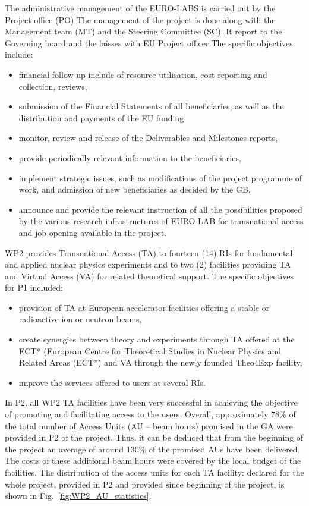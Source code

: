 The administrative management of the EURO-LABS is carried out by the Project office (PO) The management of the project is done along with the Management team (MT) and the Steering Committee (SC). It report to the Governing board and the laisses with EU Project officer.The specific objectives include:
\begin{itemize}
    \item financial follow-up include of resource utilisation, cost reporting and collection, reviews,
    \item submission of the Financial Statements of all beneficiaries, as well as the distribution and payments of the EU funding,
    \item monitor, review and release of the Deliverables and Milestones reports,
    \item provide periodically relevant information to the beneficiaries,
    \item implement strategic issues, such as modifications of the project programme of work, and admission of new beneficiaries as decided by the GB,
    \item announce and provide the relevant instruction of all the possibilities   proposed by the various research infrastructures of EURO-LAB for transnational access and job opening available in the project.
\end{itemize}


WP2 provides Transnational Access (TA) to fourteen (14) RIs for fundamental and applied nuclear physics experiments and to two (2) facilities providing TA and Virtual Access (VA) for related theoretical support. 
The specific objectives for P1 included: 
\begin{itemize}
    \item provision of TA at European accelerator facilities offering a stable or radioactive ion or neutron beams,
    \item create synergies between theory and experiments through TA offered at the ECT* (European Centre for Theoretical Studies in Nuclear Physics and Related Areas (ECT*) and VA through the newly founded Theo4Exp facility,
    \item improve the services offered to users at several RIs.
\end{itemize}

In P2, all WP2 TA facilities have been very successful in achieving the objective of promoting and facilitating access to the users. Overall, approximately 78\% of the total number of Access Units (AU – beam hours) promised in the GA were provided in P2 of the project. Thus, it can be deduced that from the beginning of the project an average of around 130\% of the promised AUs have been delivered. The costs of these additional beam hours were covered by the local budget of the facilities. The distribution of the access units for each TA facility: declared for the whole project, provided in P2 and provided since beginning of the project, is shown in Fig.~\ref{fig:WP2_AU_statistics}.

